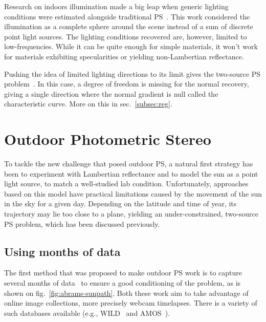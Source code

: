 Research on indoors illumination made a big leap when generic lighting conditions were estimated alongside traditional PS~\cite{basri-ijcv-2007}. This work considered the illumination as a complete sphere around the scene instead of a sum of discrete point light sources. The lighting conditions recovered are, however, limited to low-frequencies. While it can be quite enough for simple materials, it won't work for materials exhibiting specularities or yielding non-Lambertian reflectance.

Pushing the idea of limited lighting directions to its limit gives the two-source PS problem~\cite{hernandez-pami-11}. In this case, a degree of freedom is missing for the normal recovery, giving a single direction where the normal gradient is null called the characteristic curve. More on this in sec.~\ref{subsec:reg}.



\section{Outdoor Photometric Stereo}

To tackle the new challenge that posed outdoor PS, a natural first strategy has been to experiment with Lambertian reflectance and to model the sun as a point light source, to match a well-studied lab condition. Unfortunately, approaches based on this model have practical limitations caused by the movement of the sun in the sky for a given day. Depending on the latitude and time of year, its trajectory may lie too close to a plane, yielding an under-constrained, two-source PS problem, which has been discussed previously.

\subsection{Using months of data}
\label{sota:ops-months}

The first method that was proposed to make outdoor PS work is to capture several months of data~\cite{ackermann-cvpr-12,abrams-eccv-12} to ensure a good conditioning of the problem, as is shown on fig.~\ref{fig:abrams-sunpath}. Both these work aim to take advantage of online image collections, more precisely webcam timelapses. There is a variety of such databases available (e.g., WILD~\cite{narasimhan-eccv-06} and AMOS~\cite{jacobs-cvpr-2007}).


